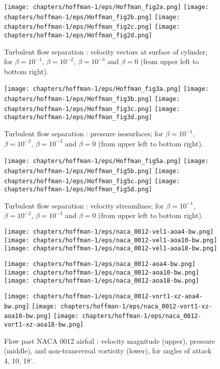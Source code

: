 \begin{figure}
\centering
\texttt{[image: chapters/hoffman-1/eps/Hoffman\_fig2a.png]}
\texttt{[image: chapters/hoffman-1/eps/Hoffman\_fig2b.png]}
\texttt{[image: chapters/hoffman-1/eps/Hoffman\_fig2c.png]}
\texttt{[image: chapters/hoffman-1/eps/Hoffman\_fig2d.png]}
\caption{Turbulent flow separation  \cite{JanssonHoffman2009}: velocity vectors at surface of cylinder; for $\beta = 10^{-1}$, $\beta = 10^{-2}$, $\beta = 10^{-3}$ and $\beta = 0$ (from upper left to bottom right).}
\label{fig:1}
\end{figure}

\begin{figure}
\centering
\texttt{[image: chapters/hoffman-1/eps/Hoffman\_fig3a.png]}
\texttt{[image: chapters/hoffman-1/eps/Hoffman\_fig3b.png]}
\texttt{[image: chapters/hoffman-1/eps/Hoffman\_fig3c.png]}
\texttt{[image: chapters/hoffman-1/eps/Hoffman\_fig3d.png]}
\caption{Turbulent flow separation \cite{JanssonHoffman2009}: pressure isosurfaces; for $\beta = 10^{-1}$, $\beta = 10^{-2}$, $\beta = 10^{-3}$ and $\beta = 0$ (from upper left to bottom right).}
\label{fig:2}
\end{figure}

\begin{figure}
\centering
\texttt{[image: chapters/hoffman-1/eps/Hoffman\_fig5a.png]}
\texttt{[image: chapters/hoffman-1/eps/Hoffman\_fig5b.png]}
\texttt{[image: chapters/hoffman-1/eps/Hoffman\_fig5c.png]}
\texttt{[image: chapters/hoffman-1/eps/Hoffman\_fig5d.png]}
\caption{Turbulent flow separation \cite{JanssonHoffman2009}: velocity streamlines; for $\beta = 10^{-1}$, $\beta = 10^{-2}$, $\beta = 10^{-3}$ and $\beta = 0$ (from upper left to bottom right).}
\label{fig:3}
\end{figure}

\begin{figure}[bhpt]
\centerline{
\texttt{[image: chapters/hoffman-1/eps/naca\_0012-vel1-aoa4-bw.png]}
\texttt{[image: chapters/hoffman-1/eps/naca\_0012-vel1-aoa10-bw.png]}
\texttt{[image: chapters/hoffman-1/eps/naca\_0012-vel1-aoa18-bw.png]}
}
\centerline{
\texttt{[image: chapters/hoffman-1/eps/naca\_0012-aoa4-bw.png]}
\texttt{[image: chapters/hoffman-1/eps/naca\_0012-aoa10-bw.png]}
\texttt{[image: chapters/hoffman-1/eps/naca\_0012-aoa18-bw.png]}
}
\centerline{
\texttt{[image: chapters/hoffman-1/eps/naca\_0012-vort1-xz-aoa4-bw.png]}
\texttt{[image: chapters/hoffman-1/eps/naca\_0012-vort1-xz-aoa10-bw.png]}
\texttt{[image: chapters/hoffman-1/eps/naca\_0012-vort1-xz-aoa18-bw.png]}
}
\caption{Flow past NACA 0012 airfoil \cite{HoffmanJohnson2006}: velocity magnitude (upper), pressure (middle), and non-transversal vorticity (lower), for angles of attack 4, 10, 18$^\circ$.}
\label{fig:naca}
\end{figure}

